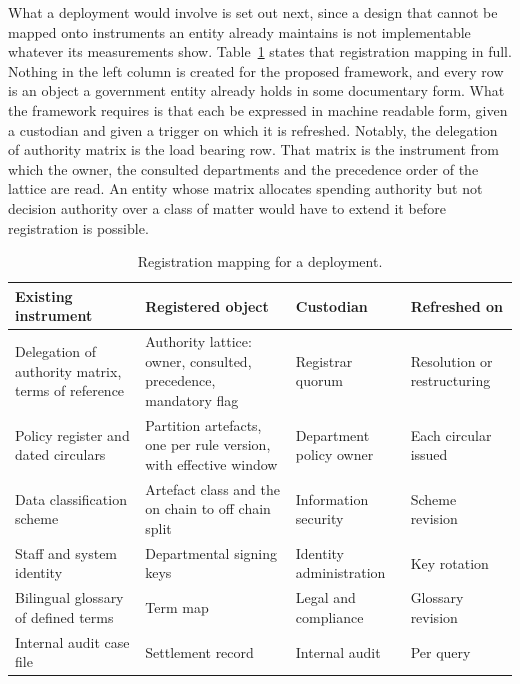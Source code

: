 \documentclass[journal]{IEEEtran}
\begin{document}
What a deployment would involve is set out next, since a design that cannot be mapped onto instruments an entity already maintains is not implementable whatever its measurements show. Table~\ref{tab:registration} states that registration mapping in full. Nothing in the left column is created for the proposed framework, and every row is an object a government entity already holds in some documentary form. What the framework requires is that each be expressed in machine readable form, given a custodian and given a trigger on which it is refreshed. Notably, the delegation of authority matrix is the load bearing row. That matrix is the instrument from which the owner, the consulted departments and the precedence order of the lattice are read. An entity whose matrix allocates spending authority but not decision authority over a class of matter would have to extend it before registration is possible.

\begin{table}[!t]
\centering
\caption{Registration mapping for a deployment.}
\label{tab:registration}
\scriptsize
\setlength{\tabcolsep}{3.5pt}
\begin{tabular}{@{}p{}p{}p{}p{}@{}}
\toprule
Existing instrument & Registered object & Custodian & Refreshed on \\
\midrule
Delegation of authority matrix, terms of reference & Authority lattice: owner, consulted, precedence, mandatory flag & Registrar quorum & Resolution or restructuring \\
Policy register and dated circulars & Partition artefacts, one per rule version, with effective window & Department policy owner & Each circular issued \\
Data classification scheme & Artefact class and the on chain to off chain split & Information security & Scheme revision \\
Staff and system identity & Departmental signing keys & Identity administration & Key rotation \\
Bilingual glossary of defined terms & Term map & Legal and compliance & Glossary revision \\
Internal audit case file & Settlement record & Internal audit & Per query \\
\bottomrule
\end{tabular}
\end{table}
\end{document}
